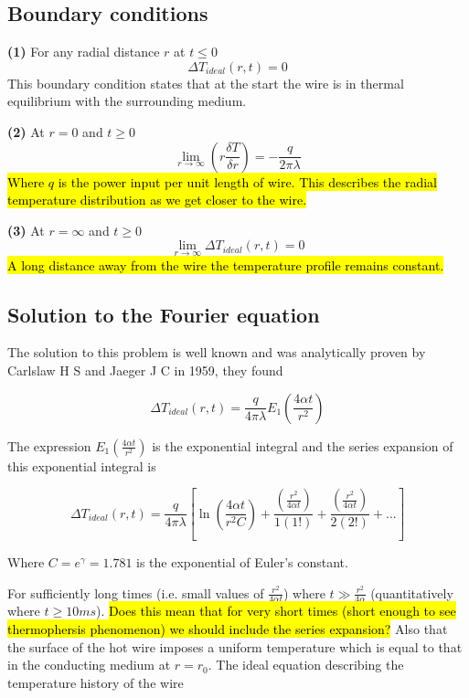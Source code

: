 \documentclass{article}
\begin{document}
\subsection{Boundary conditions}
\textbf{(1)} For any radial distance $r$ at $t \leq 0$ 
$$\Delta T_{ideal} (r, t) = 0$$
This boundary condition states that at the start the wire is in thermal equilibrium with the surrounding medium.

\vspace{3mm}

\textbf{(2)} At $r = 0 $ and $t \geq 0$
$$ \displaystyle \lim_{r\to \infty} \left(r \frac{\delta T}{\delta r} \right) = -\frac{q}{2 \pi \lambda}$$
\hl{Where $q$ is the power input per unit length of wire. This describes the radial temperature distribution as we get closer to the wire.}

\newpage

\textbf{(3)} At $r = \infty$ and $t \geq 0$ 
$$\displaystyle \lim_{r\to \infty} \Delta T_{ideal}(r,t) = 0$$
\hl{A long distance away from the wire the temperature profile remains constant.}

\subsection{Solution to the Fourier equation}

The solution to this problem is well known and was analytically proven by Carlslaw H S and Jaeger J C in 1959, they found

$$\Delta T_{ideal}(r,t) =  \frac{q}{4 \pi \lambda}  E_1 \left( \frac{4 \alpha t}{r^2}\right)$$

The expression $E_1 \left( \frac{4 \alpha t}{r^2}\right)$ is the exponential integral and the series expansion of this exponential integral is 

$$\Delta T_{ideal}(r,t) = \frac{q}{4 \pi \lambda} \left[ \ln \left( \frac{4 \alpha t}{r^2 C}\right) + \frac{\left( \frac{r^2}{4 \alpha t} \right)}{1(1!)} + \frac{\left( \frac{r^2}{4 \alpha t} \right)}{2(2!)} + ... \right]$$

Where $ C = e^{\gamma} = 1.781 $ is the exponential of Euler's constant. 

\vspace{3mm}

For sufficiently long times (i.e. small values of $\frac{r^2}{4 \alpha t}$) where $t \gg \frac{r^2}{4 \alpha}$ (quantitatively where $t \geq 10ms$). \hl{Does this mean that for very short times (short enough to see thermophersis phenomenon) we should include the series expansion?} Also that the surface of the hot wire imposes a uniform temperature which is equal to that in the conducting medium at $r = r_0$. The ideal equation describing the temperature history of the wire 
\end{document}
